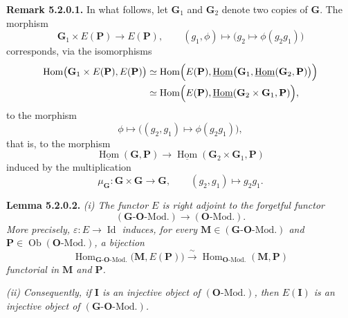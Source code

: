 \medskip
\noindent\textbf{Remark 5.2.0.1.}
In what follows, let \(\mathbf G_1\) and \(\mathbf G_2\) denote two copies
of \(\mathbf G\). The morphism
\[
  \mathbf G_1\times E(\mathbf P)\longrightarrow E(\mathbf P),
  \qquad
  (g_1,\phi)\longmapsto\bigl(g_2\longmapsto\phi(g_2g_1)\bigr)
\]
corresponds, via the isomorphisms
\begin{align*}
  \operatorname{Hom}\bigl(\mathbf G_1\times E(\mathbf P),E(\mathbf P)\bigr)
    &\simeq
      \operatorname{Hom}\Bigl(E(\mathbf P),
        \underline{\operatorname{Hom}}\bigl(
          \mathbf G_1,
          \underline{\operatorname{Hom}}(\mathbf G_2,\mathbf P)
        \bigr)\Bigr)\\
    &\simeq
      \operatorname{Hom}\Bigl(E(\mathbf P),
        \underline{\operatorname{Hom}}(
          \mathbf G_2\times\mathbf G_1,\mathbf P)
      \Bigr),
\end{align*}
to the morphism
\[
  \phi\longmapsto\bigl((g_2,g_1)\longmapsto\phi(g_2g_1)\bigr),
\]
that is, to the morphism
\[
  \underline{\operatorname{Hom}}(\mathbf G,\mathbf P)
    \longrightarrow
  \underline{\operatorname{Hom}}(\mathbf G_2\times\mathbf G_1,\mathbf P)
\]
induced by the multiplication
\[
  \mu_{\mathbf G}:\mathbf G\times\mathbf G\longrightarrow\mathbf G,
  \qquad (g_2,g_1)\longmapsto g_2g_1.
\]

\medskip
\noindent\textbf{Lemma 5.2.0.2.}
\textit{(i) The functor \(E\) is right adjoint to the forgetful functor
\[
  (\mathbf G\text{-}\mathbf O\text{-Mod.})
    \longrightarrow(\mathbf O\text{-Mod.}).
\]
More precisely, \(\varepsilon:E\to\operatorname{Id}\) induces, for every
\(\mathbf M\in(\mathbf G\text{-}\mathbf O\text{-Mod.})\) and
\(\mathbf P\in\operatorname{Ob}(\mathbf O\text{-Mod.})\), a bijection}
\[
  \operatorname{Hom}_{\mathbf G\text{-}\mathbf O\text{-Mod.}}
    \bigl(\mathbf M,E(\mathbf P)\bigr)
  \xrightarrow{\ \sim\ }
  \operatorname{Hom}_{\mathbf O\text{-Mod.}}(\mathbf M,\mathbf P)
\]
\textit{functorial in \(\mathbf M\) and \(\mathbf P\).}

\textit{(ii) Consequently, if \(\mathbf I\) is an injective object of
\((\mathbf O\text{-Mod.})\), then \(E(\mathbf I)\) is an injective object
of \((\mathbf G\text{-}\mathbf O\text{-Mod.})\).}

